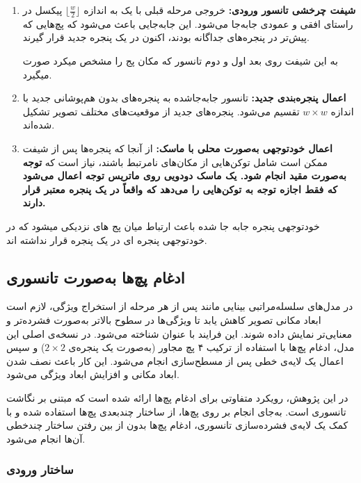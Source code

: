 \begin{enumerate}
	\item \textbf{شیفت چرخشی تانسور ورودی:} خروجی مرحله قبلی  با یک  به اندازه $\lfloor \frac{w}{2} \rfloor$ پیکسل در راستای افقی و عمودی جابه‌جا می‌شود. این جابه‌جایی باعث می‌شود که پچ‌هایی که پیش‌تر در پنجره‌های جداگانه بودند، اکنون در یک پنجره جدید قرار گیرند.
	
	به این شیفت روی بعد اول و دوم تانسور که مکان پج را مشخص میکرد صورت میگیرد.
	
	\item \textbf{اعمال پنجره‌بندی جدید:} تانسور جابه‌جا‌شده به پنجره‌های بدون هم‌پوشانی جدید با اندازه $w \times w$ تقسیم می‌شود. پنجره‌های جدید از موقعیت‌های مختلف تصویر تشکیل شده‌اند.
	
	\item \textbf{اعمال خودتوجهی به‌صورت محلی با ماسک:} از آنجا که پنجره‌ها پس از شیفت ممکن است شامل توکن‌هایی از مکان‌های نامرتبط باشند، نیاز است که \textbf{توجه به‌صورت مقید  انجام شود. یک ماسک دودویی روی ماتریس توجه اعمال می‌شود که فقط اجازه توجه به توکن‌هایی را می‌دهد که واقعاً در یک پنجره معتبر قرار دارند.}
	
\end{enumerate}



خودتوجهی پنجره جابه جا شده باعث ارتباط میان پج های نزدیکی میشود که در خودتوجهی پنجره ای در یک پنجره قرار نداشته اند. 



\subsection{ادغام پچ‌ها به‌صورت تانسوری}

در مدل‌های سلسله‌مراتبی بینایی مانند پس از هر مرحله از استخراج ویژگی، لازم است ابعاد مکانی تصویر کاهش یابد تا ویژگی‌ها در سطوح بالاتر به‌صورت فشرده‌تر و معنایی‌تر نمایش داده شوند. این فرایند با عنوان  شناخته می‌شود. در نسخه‌ی اصلی این مدل، ادغام پچ‌ها با استفاده از ترکیب ۴ پچ مجاور (به‌صورت یک پنجره‌ی $2 \times 2$) و سپس اعمال یک لایه‌ی خطی پس از مسطح‌سازی انجام می‌شود. این کار باعث نصف شدن ابعاد مکانی و افزایش ابعاد ویژگی می‌شود.

در این پژوهش، رویکرد متفاوتی برای ادغام پچ‌ها ارائه شده است که مبتنی بر نگاشت تانسوری است. به‌جای انجام  بر روی پچ‌ها، از ساختار چندبعدی پچ‌ها استفاده شده و با کمک یک لایه‌ی فشرده‌سازی تانسوری، ادغام پچ‌ها بدون از بین رفتن ساختار چندخطی آن‌ها انجام می‌شود.

\subsubsection*{ساختار ورودی}

